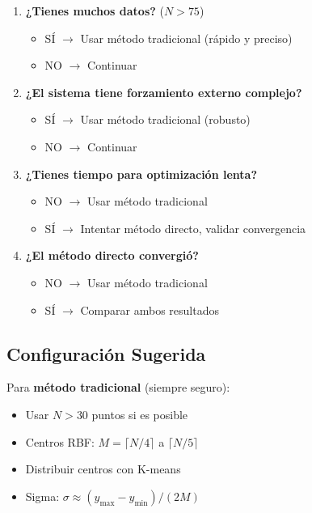 \documentclass[11pt,a4paper]{article}
\begin{document}
\begin{enumerate}
\item \textbf{¿Tienes muchos datos?} ($N > 75$)
   \begin{itemize}
   \item SÍ $\rightarrow$ Usar método tradicional (rápido y preciso)
   \item NO $\rightarrow$ Continuar
   \end{itemize}

\item \textbf{¿El sistema tiene forzamiento externo complejo?}
   \begin{itemize}
   \item SÍ $\rightarrow$ Usar método tradicional (robusto)
   \item NO $\rightarrow$ Continuar
   \end{itemize}

\item \textbf{¿Tienes tiempo para optimización lenta?}
   \begin{itemize}
   \item NO $\rightarrow$ Usar método tradicional
   \item SÍ $\rightarrow$ Intentar método directo, validar convergencia
   \end{itemize}

\item \textbf{¿El método directo convergió?}
   \begin{itemize}
   \item NO $\rightarrow$ Usar método tradicional
   \item SÍ $\rightarrow$ Comparar ambos resultados
   \end{itemize}
\end{enumerate}

\subsection{Configuración Sugerida}

Para \textbf{método tradicional} (siempre seguro):
\begin{itemize}
\item Usar $N > 30$ puntos si es posible
\item Centros RBF: $M = \lceil N/4 \rceil$ a $\lceil N/5 \rceil$
\item Distribuir centros con K-means
\item Sigma: $\sigma \approx (y_{\max} - y_{\min}) / (2M)$
\end{itemize}
\end{document}
